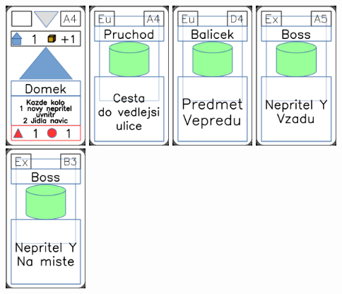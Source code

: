 \documentclass[a4paper]{article}
\begin{document}
	\includegraphics[width=3.0cm]{img-3_3}
	\includegraphics[width=3.0cm]{img-4_33}
	\includegraphics[width=3.0cm]{img-4_18}
	\includegraphics[width=3.0cm]{img-4_4}
	\includegraphics[width=3.0cm]{img-4_7}
\end{document}
